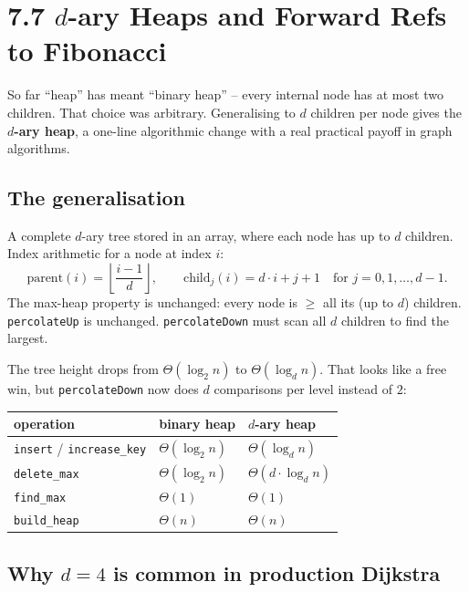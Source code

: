 \documentclass[11pt]{article}
\begin{document}
\section{7.7 \texorpdfstring{$d$}{d}-ary Heaps and Forward Refs to Fibonacci}

So far ``heap'' has meant ``binary heap'' -- every internal node has
at most two children. That choice was arbitrary. Generalising to
$d$ children per node gives the \textbf{$d$-ary heap}, a one-line
algorithmic change with a real practical payoff in graph algorithms.

\subsection*{The generalisation}

\begin{defnbox}
A complete $d$-ary tree stored in an array, where each node has up to
$d$ children. Index arithmetic for a node at index $i$:
\[
\text{parent}(i) = \left\lfloor \frac{i - 1}{d} \right\rfloor,
\qquad
\text{child}_j(i) = d \cdot i + j + 1
\quad \text{for } j = 0, 1, \ldots, d - 1.
\]
The max-heap property is unchanged: every node is $\ge$ all its (up
to $d$) children. \texttt{percolateUp} is unchanged. \texttt{percolateDown}
must scan all $d$ children to find the largest.
\end{defnbox}

The tree height drops from $\Theta(\log_2 n)$ to $\Theta(\log_d n)$.
That looks like a free win, but \texttt{percolateDown} now does $d$
comparisons per level instead of $2$:

\begin{center}
\begin{tabular}{lll}
operation         & binary heap     & $d$-ary heap                    \\
\hline
\texttt{insert} / \texttt{increase\_key} & $\Theta(\log_2 n)$ & $\Theta(\log_d n)$ \\
\texttt{delete\_max}    & $\Theta(\log_2 n)$ & $\Theta(d \cdot \log_d n)$ \\
\texttt{find\_max}      & $\Theta(1)$         & $\Theta(1)$                   \\
\texttt{build\_heap}    & $\Theta(n)$         & $\Theta(n)$                   \\
\end{tabular}
\end{center}

\subsection*{Why $d = 4$ is common in production Dijkstra}
\end{document}
